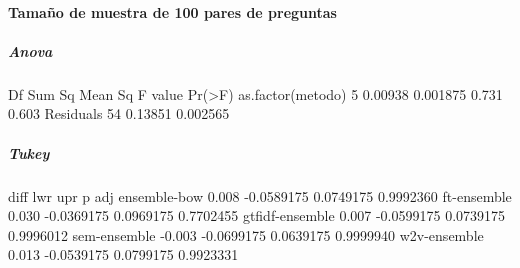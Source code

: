 \paragraph{Tamaño de muestra de 100 pares de preguntas}

\subparagraph{Anova}
\begin{rc}
                 Df  Sum Sq  Mean Sq F value Pr(>F)
as.factor(metodo)  5 0.00938 0.001875   0.731  0.603
Residuals         54 0.13851 0.002565
\end{rc}

\subparagraph{Tukey}
\begin{rc}
                 diff        lwr       upr     p adj
ensemble-bow     0.008 -0.0589175 0.0749175 0.9992360
ft-ensemble      0.030 -0.0369175 0.0969175 0.7702455
gtfidf-ensemble  0.007 -0.0599175 0.0739175 0.9996012
sem-ensemble    -0.003 -0.0699175 0.0639175 0.9999940
w2v-ensemble     0.013 -0.0539175 0.0799175 0.9923331
\end{rc}


